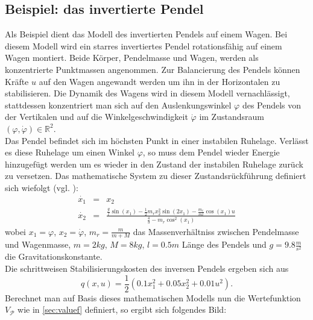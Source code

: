 \documentclass[12pt,a4paper,twoside]{article}
\begin{document}
	\subsection{Beispiel: das invertierte Pendel}
	Als Beispiel dient das Modell des invertierten Pendels auf einem Wagen. Bei diesem Modell wird ein starres 
	invertiertes Pendel rotationsfähig auf einem Wagen montiert. Beide Körper, Pendelmasse und Wagen, werden als 
	konzentrierte Punktmassen angenommen. Zur Balancierung des Pendels können Kräfte $u$ auf den Wagen angewandt 
	werden um ihn in der Horizontalen zu stabilisieren. Die Dynamik des Wagens wird in diesem Modell vernachlässigt, 
	stattdessen konzentriert man sich auf den Auslenkungswinkel $\varphi$ des Pendels von der Vertikalen und auf die 
	Winkelgeschwindigkeit $\dot{\varphi}$ im Zustandsraum $(\varphi,\dot{\varphi})\in \mathds{R}^2$. \\
	Das Pendel befindet sich im höchsten Punkt in einer instabilen Ruhelage. Verlässt es diese Ruhelage um einen 
	Winkel $\varphi$, so muss dem Pendel wieder Energie hinzugefügt werden um es wieder in den Zustand der instabilen 
	Ruhelage zurück zu versetzen. Das mathematische System zu dieser Zustandsrückführung definiert sich 
	wiefolgt (vgl. \citep{Grune2005}):
	\begin{eqnarray}
		\dot{x_1} &=& x_2 \\
		\dot{x_2} &=& \frac{\frac{g}{l}\sin (x_1)-\frac{1}{2}m_rx_2^2\sin (2x_1)-\frac{m_r}{ml}\cos (x_1)u}{\frac{4}{3}-m_r\cos ^2(x_1)}
	\end{eqnarray}
	wobei $x_1=\varphi$, $x_2=\dot{\varphi}$, $m_r=\frac{m}{m+M}$ das Massenverhältniss zwischen Pendelmasse und 
	Wagenmasse, $m=2kg$, $M=8kg$, $l=0.5m$ Länge des Pendels und $g=9.8\frac{m}{s^2}$ die Gravitationskonstante. \\
	Die schrittweisen Stabilisierungskosten des inversen Pendels ergeben sich aus
	\begin{equation}
		q(x,u)=\frac{1}{2}(0.1x_1^2+0.05x_2^2+0.01u^2).
	\end{equation}
	Berechnet man auf Basis dieses mathematischen Modells nun die Wertefunktion $V_\mathcal{P}$ wie in 
	\ref{sec:valuef} definiert, so ergibt sich folgendes Bild:
\end{document}
